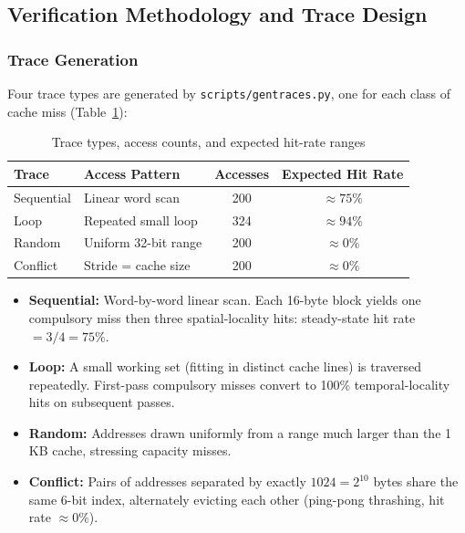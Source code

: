 \documentclass[conference]{IEEEtran}
\renewcommand{\_}{\textunderscore\allowbreak{}}
\begin{document}
\subsection{Verification Methodology and Trace Design}
\label{sec:sol-d}

\subsubsection{Trace Generation}

Four trace types are generated by \texttt{scripts/gen\_traces.py},
one for each class of cache miss (Table~\ref{tab:traces}):

\begin{table}[!t]
  \centering
  \caption{Trace types, access counts, and expected hit-rate ranges}
  \label{tab:traces}
  \renewcommand{\arraystretch}{1.25}
  \small
  \begin{tabular}{@{}llcc@{}}
    \toprule
    \textbf{Trace} & \textbf{Access Pattern} &
    \textbf{Accesses} & \textbf{Expected Hit Rate} \\
    \midrule
    Sequential & Linear word scan      & 200 & $\approx 75\%$ \\
    Loop       & Repeated small loop   & 324 & $\approx 94\%$ \\
    Random     & Uniform 32-bit range  & 200 & $\approx 0\%$  \\
    Conflict   & Stride = cache size   & 200 & $\approx 0\%$  \\
    \bottomrule
  \end{tabular}
\end{table}

\begin{itemize}
  \item \textbf{Sequential:} Word-by-word linear scan. Each 16-byte
        block yields one compulsory miss then three spatial-locality
        hits: steady-state hit rate $= 3/4 = 75\%$.
  \item \textbf{Loop:} A small working set (fitting in distinct cache
        lines) is traversed repeatedly. First-pass compulsory misses
        convert to 100\% temporal-locality hits on subsequent passes.
  \item \textbf{Random:} Addresses drawn uniformly from a range much
        larger than the 1\,KB cache, stressing capacity misses.
  \item \textbf{Conflict:} Pairs of addresses separated by exactly
        $1024 = 2^{10}$ bytes share the same 6-bit index, alternately
        evicting each other (ping-pong thrashing, hit rate $\approx 0\%$).
\end{itemize}
\end{document}
